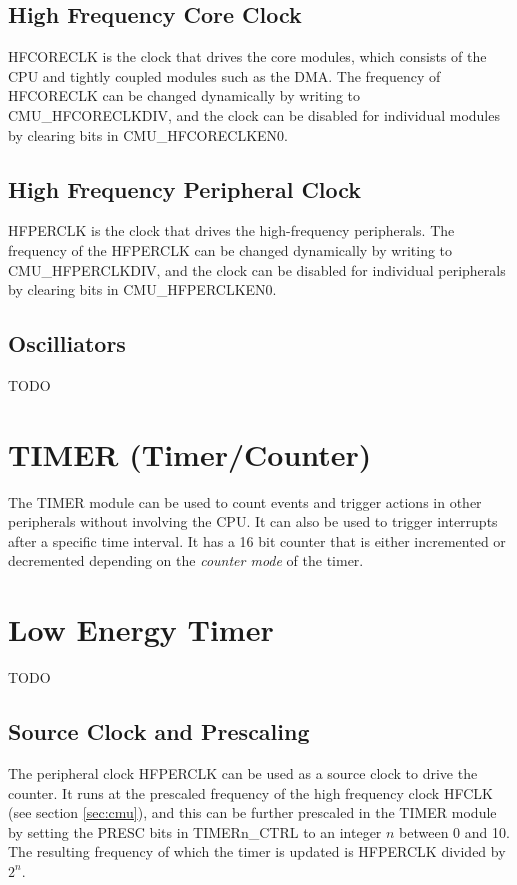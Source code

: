 \subsection{High Frequency Core Clock}
HFCORECLK is the clock that drives the core modules, which consists of the CPU and tightly coupled modules such as the DMA. The frequency of HFCORECLK can be changed dynamically by writing to CMU\_HFCORECLKDIV, and the clock can be disabled for individual modules by clearing bits in CMU\_HFCORECLKEN0. 

\subsection{High Frequency Peripheral Clock}
HFPERCLK is the clock that drives the high-frequency peripherals. The frequency of the HFPERCLK can be changed dynamically by writing to CMU\_HFPERCLKDIV, and the clock can be disabled for individual peripherals by clearing bits in CMU\_HFPERCLKEN0. 


\subsection{Oscilliators}
TODO %


\section{TIMER (Timer/Counter)}
The TIMER module can be used to count events and trigger actions in other peripherals without involving the CPU. It can also be used to trigger interrupts after a specific time interval. It has a 16 bit counter that is either incremented or decremented depending on the \emph{counter mode} of the timer.


\section{Low Energy Timer}\label{sec:letimer}
TODO %


\subsection{Source Clock and Prescaling} The peripheral clock HFPERCLK can be used as a source clock to drive the counter. It runs at the prescaled frequency of the high frequency clock HFCLK (see section \ref{sec:cmu}), and this can be further prescaled in the TIMER module by setting the PRESC bits in TIMERn\_CTRL to an integer $n$ between 0 and 10. The resulting frequency of which the timer is updated is HFPERCLK divided by $2^{n}$.

